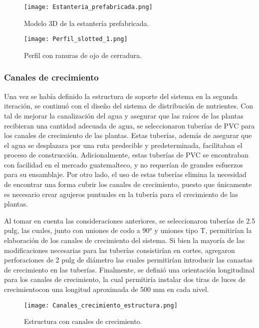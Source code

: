 \begin{figure}[H]
	\centering
	\texttt{[image: Estanteria\_prefabricada.png]}
	\caption{Modelo 3D de la estantería prefabricada.}
	\label{fig:estanteria_prefab}
\end{figure}

\begin{figure}[H]
	\centering
	\texttt{[image: Perfil\_slotted\_1.png]}
	\caption{Perfil con ranuras de ojo de cerradura.}
	\label{fig:Perfil_slotted}
\end{figure}

\subsubsection{Canales de crecimiento}

Una vez se había definido la estructura de soporte del sistema en la segunda iteración, se continuó con el diseño del sistema de distribución de nutrientes. Con tal de mejorar la canalización del agua y asegurar que las raíces de las plantas recibieran una cantidad adecuada de agua, se seleccionaron tuberías de PVC para los canales de crecimiento de las plantas. Estas tuberías, además de asegurar que el agua se desplazara por una ruta predecible y predeterminada, facilitaban el proceso de construcción. Adicionalmente, estas tuberías de PVC se encontraban con facilidad en el mercado guatemalteco, y no requerían de grandes esfuerzos para su ensamblaje. Por otro lado, el uso de estas tuberías elimina la necesidad de encontrar una forma cubrir los canales de crecimiento, puesto que únicamente es necesario crear agujeros puntuales en la tubería para el crecimiento de las plantas. 

Al tomar en cuenta las consideraciones anteriores, se seleccionaron tuberías de 2.5 pulg, las cuales, junto con uniones de codo a 90° y uniones tipo T, permitirían la elaboración de los canales de crecimiento del sistema. Si bien la mayoría de las modificaciones necesarias para las tuberías consistirían en cortes, agregaron perforaciones de 2 pulg de diámetro las cuales permitirían introducir las canastas de crecimiento en las tuberías. Finalmente, se definió una orientación longitudinal para los canales de crecimiento, la cual permitiría instalar dos tiras de luces de crecimientocon una longitud aproximada de 500 mm en cada nivel. 

\begin{figure}[H]
	\centering
	\texttt{[image: Canales\_crecimiento\_estructura.png]}
	\caption{Estructura con canales de crecimiento.}
	\label{fig:canales_crecimiento}
\end{figure}

